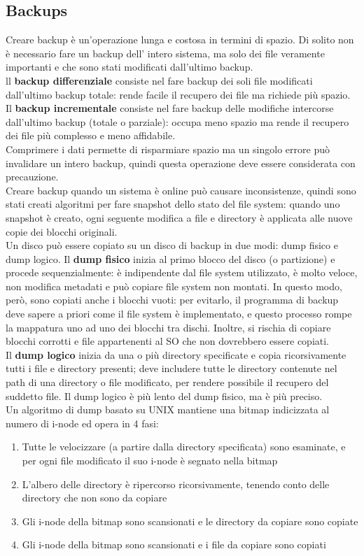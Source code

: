 \documentclass[12pt]{article}
\begin{document}
\subsection{Backups}
Creare backup è un'operazione lunga e costosa in termini di spazio. Di solito non è necessario fare un backup dell'
intero sistema, ma solo dei file veramente importanti e che sono stati modificati dall'ultimo backup.\\
ll \textbf{backup differenziale} consiste nel fare backup dei soli file modificati dall'ultimo backup totale: rende 
facile il recupero dei file ma richiede più spazio.
Il \textbf{backup incrementale} consiste nel fare backup delle modifiche intercorse dall'ultimo backup (totale o 
parziale): occupa meno spazio ma rende il recupero dei file più complesso e meno affidabile.\\
Comprimere i dati permette di risparmiare spazio ma un singolo errore può invalidare un intero backup, quindi questa
operazione deve essere considerata con precauzione.\\
Creare backup quando un sistema è online può causare inconsistenze, quindi sono stati creati algoritmi per fare
snapshot dello stato del file system: quando uno snapshot è creato, ogni seguente modifica a file e directory è
applicata alle nuove copie dei blocchi originali.\\
Un disco può essere copiato su un disco di backup in due modi: dump fisico e dump logico.
Il \textbf{dump fisico} inizia al primo blocco del disco (o partizione) e procede sequenzialmente: è indipendente dal
file system utilizzato, è molto veloce, non modifica metadati e può copiare file system non montati. In questo modo,
però, sono copiati anche i blocchi vuoti: per evitarlo, il programma di backup deve sapere a priori come il file
system è implementato, e questo processo rompe la mappatura uno ad uno dei blocchi tra dischi. Inoltre, si rischia di
copiare blocchi corrotti e file appartenenti al SO che non dovrebbero essere copiati.\\
Il \textbf{dump logico} inizia da una o più directory specificate e copia ricorsivamente tutti i file e directory
presenti; deve includere tutte le directory contenute nel path di una directory o file modificato, per 
rendere possibile il recupero del suddetto file. Il dump logico è più lento del dump fisico, ma è più preciso.\\
Un algoritmo di dump basato su UNIX mantiene una bitmap indicizzata al numero di i-node ed opera in 4 fasi:
\begin{enumerate}
    \item Tutte le velocizzare (a partire dalla directory specificata) sono esaminate, e per ogni file modificato il suo 
    i-node è segnato nella bitmap
    \item L'albero delle directory è ripercorso ricorsivamente, tenendo conto delle directory che non sono da copiare
    \item Gli i-node della bitmap sono scansionati e le directory da copiare sono copiate
    \item Gli i-node della bitmap sono scansionati e i file da copiare sono copiati
\end{enumerate}
\end{document}

